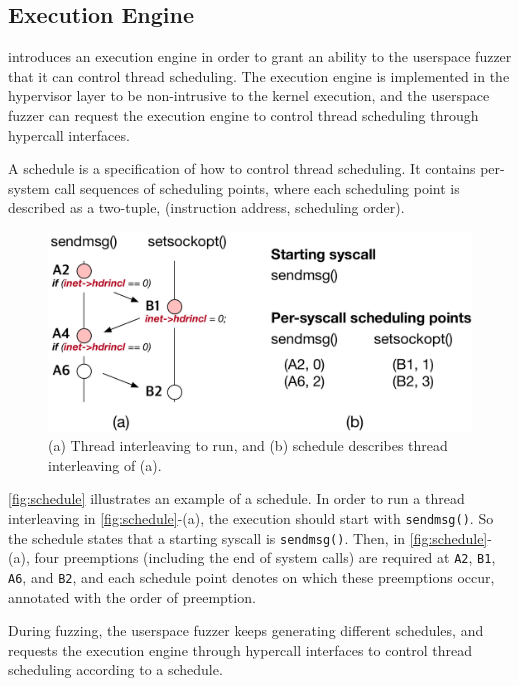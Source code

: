 \subsection{Execution Engine}
\label{ss:engine}

\sys introduces an execution engine in order to grant an ability to
the userspace fuzzer that it can control thread scheduling.
%
The execution engine is implemented in the hypervisor layer to be
non-intrusive to the kernel execution, and the userspace fuzzer can
request the execution engine to control thread scheduling through
hypercall interfaces.


%
A schedule is a specification of how to control thread scheduling.
%
It contains per-system call sequences of scheduling points, where each
scheduling point is described as a two-tuple, (instruction address,
scheduling order).

\begin{figure}[t]
  \centering
  \includegraphics[width=0.9\linewidth]{fig/schedule.pdf}
  \caption{(a) Thread interleaving to run, and (b) schedule describes
    thread interleaving of (a). }
  \label{fig:schedule}
\end{figure}

\autoref{fig:schedule} illustrates an example of a schedule. In order
to run a thread interleaving in \autoref{fig:schedule}-(a), the
execution should start with \texttt{sendmsg()}. So the schedule states
that a starting syscall is \texttt{sendmsg()}.
%
Then, in \autoref{fig:schedule}-(a), four preemptions (including the
end of system calls) are required at \texttt{A2}, \texttt{B1},
\texttt{A6}, and \texttt{B2}, and each schedule point denotes on which
these preemptions occur, annotated with the order of preemption.


During fuzzing, the userspace fuzzer keeps generating different
schedules, and requests the execution engine through hypercall
interfaces to control thread scheduling according to a schedule.





